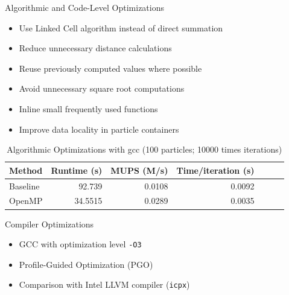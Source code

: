 \documentclass[aspectratio=169]{beamer}
\begin{document}


\begin{frame}{Algorithmic and Code-Level Optimizations}
    \begin{itemize}
        \item Use Linked Cell algorithm instead of direct summation
        \item Reduce unnecessary distance calculations
        \item Reuse previously computed values where possible
        \item Avoid unnecessary square root computations
        \item Inline small frequently used functions
        \item Improve data locality in particle containers
    \end{itemize}
    \begin{table}[htbp]
        \centering

        \label{tab:perf_4x6}
        \setlength{\tabcolsep}{6pt}
        \renewcommand{\arraystretch}{1.5}

        \begin{tabular}{lrrrrrr}
            \toprule
            Method  & Runtime (s) & MUPS (M/s)  & Time/iteration (s)  \\
            \midrule
            Baseline & 92.739 & 0.0108 & 0.0092  \\
            OpenMP & 34.5515 & 0.0289& 0.0035  \\
            \bottomrule
        \end{tabular}
        \caption{Algorithmic Optimizations with gcc (100 particles; 10000 times iterations)}
    \end{table}
\end{frame}

\begin{frame}{Compiler Optimizations}
    \begin{itemize}
        \item GCC with optimization level \texttt{-O3}
        \item Profile-Guided Optimization (PGO)
        \item Comparison with Intel LLVM compiler (\texttt{icpx})
    \end{itemize}
\end{frame}
\end{document}
